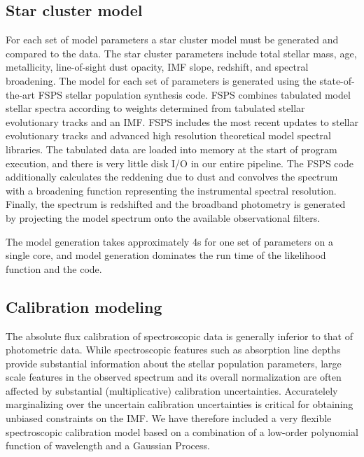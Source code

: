 \documentclass[11pt,preprint]{aastex}
\begin{document}
\subsection{Star cluster model}
For each set of model parameters a star cluster model must be generated and compared to the data. 
The star cluster parameters include total stellar mass, age, metallicity, line-of-sight dust opacity, IMF slope, redshift, and spectral broadening.
The model for each set of parameters is generated using the state-of-the-art FSPS stellar population synthesis code.
FSPS combines tabulated model stellar spectra according to weights determined from tabulated stellar evolutionary tracks and an IMF.
FSPS includes the most recent updates to stellar evolutionary tracks and advanced high resolution theoretical model spectral libraries.
The tabulated data are loaded into memory at the start of program execution, and there is very little disk I/O in our entire pipeline.
The FSPS code additionally calculates the reddening due to dust and convolves the spectrum with a broadening function representing the instrumental spectral resolution.
Finally, the spectrum is redshifted and the broadband photometry is generated by projecting the model spectrum onto the available observational filters.

The model generation takes approximately 4s for one set of parameters on a single core, and model generation dominates the run time of the likelihood function and the code.

\subsection{Calibration modeling}
\label{sec:calibration}
The absolute flux calibration of spectroscopic data is generally inferior to that of photometric data.  
While spectroscopic features such as absorption line depths provide substantial information about the stellar population parameters, large scale features in the observed spectrum and its overall normalization are often affected by substantial (multiplicative) calibration uncertainties. 
Accuratelely marginalizing over the uncertain calibration uncertainties is critical for obtaining unbiased constraints on the IMF. 
We have therefore included a very flexible spectroscopic calibration model based on a combination of a low-order polynomial function of wavelength and a Gaussian Process.
\end{document}
